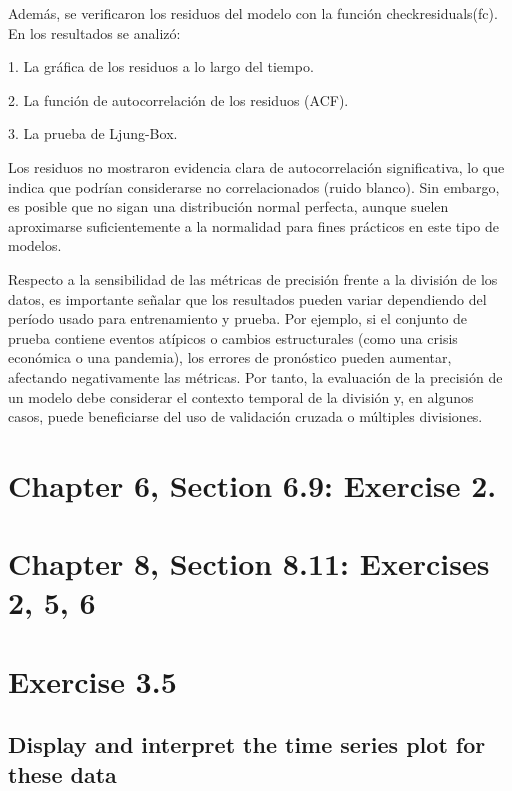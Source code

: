 \documentclass[12pt]{article}\usepackage[]{graphicx}\usepackage[]{xcolor}
\begin{document}
Además, se verificaron los residuos del modelo con la función checkresiduals(fc). En los resultados se analizó:

1. La gráfica de los residuos a lo largo del tiempo.

2. La función de autocorrelación de los residuos (ACF).

3. La prueba de Ljung-Box.

Los residuos no mostraron evidencia clara de autocorrelación significativa, lo que indica que podrían considerarse no correlacionados (ruido blanco). Sin embargo, es posible que no sigan una distribución normal perfecta, aunque suelen aproximarse suficientemente a la normalidad para fines prácticos en este tipo de modelos.

Respecto a la sensibilidad de las métricas de precisión frente a la división de los datos, es importante señalar que los resultados pueden variar dependiendo del período usado para entrenamiento y prueba. Por ejemplo, si el conjunto de prueba contiene eventos atípicos o cambios estructurales (como una crisis económica o una pandemia), los errores de pronóstico pueden aumentar, afectando negativamente las métricas. Por tanto, la evaluación de la precisión de un modelo debe considerar el contexto temporal de la división y, en algunos casos, puede beneficiarse del uso de validación cruzada o múltiples divisiones.



\section{Chapter 6, Section 6.9: Exercise 2.}





\section{Chapter 8, Section 8.11: Exercises 2, 5, 6}





\section{Exercise 3.5}


\subsection{Display and interpret the time series plot for these data}
\end{document}
